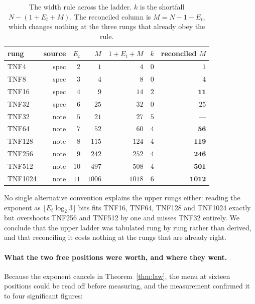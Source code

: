 \begin{table}[t]\centering
\caption{The width rule across the ladder. $k$ is the shortfall
$N - (1 + E_t + M)$. The reconciled column is $M = N - 1 - E_t$, which changes
nothing at the three rungs that already obey the rule.}
\label{tab:ladder-sweep}
\begin{tabular}{lrrrrrr}
\toprule
rung & source & $E_t$ & $M$ & $1{+}E_t{+}M$ & $k$ & reconciled $M$ \\
\midrule
TNF4    & spec & $2$  & $1$    & $4$    & $0$ & $1$ \\
TNF8    & spec & $3$  & $4$    & $8$    & $0$ & $4$ \\
TNF16   & spec & $4$  & $9$    & $14$   & $2$ & $\mathbf{11}$ \\
TNF32   & spec & $6$  & $25$   & $32$   & $0$ & $25$ \\
TNF32   & note & $5$  & $21$   & $27$   & $5$ & --- \\
TNF64   & note & $7$  & $52$   & $60$   & $4$ & $\mathbf{56}$ \\
TNF128  & note & $8$  & $115$  & $124$  & $4$ & $\mathbf{119}$ \\
TNF256  & note & $9$  & $242$  & $252$  & $4$ & $\mathbf{246}$ \\
TNF512  & note & $10$ & $497$  & $508$  & $4$ & $\mathbf{501}$ \\
TNF1024 & note & $11$ & $1006$ & $1018$ & $6$ & $\mathbf{1012}$ \\
\bottomrule
\end{tabular}
\end{table}

No single alternative convention explains the upper rungs either: reading the
exponent as $\lfloor E_t\log_2 3\rfloor$ bits fits TNF16, TNF64, TNF128 and
TNF1024 exactly but overshoots TNF256 and TNF512 by one and misses TNF32
entirely. We conclude that the upper ladder was tabulated rung by rung rather than
derived, and that reconciling it costs nothing at the rungs that are already
right.

\paragraph{What the two free positions were worth, and where they went.} Because
the exponent cancels in Theorem~\ref{thm:law}, the menu at sixteen positions could
be read off before measuring, and the measurement confirmed it to four significant
figures:

